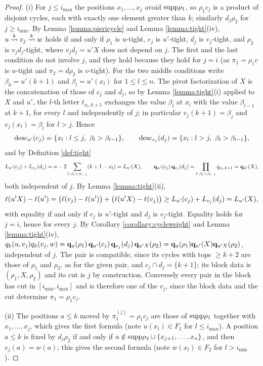 \documentclass{amsart}
\theoremstyle{definition}
\theoremstyle{remark}
\numberwithin{equation}{section}
\newcommand{\xrightsquigarrow}[2][]{%
	\mathrel{\mathop{\rightsquigarrow}\limits^{\scriptstyle #2}%
	\ifx\hfuzz#1\hfuzz\else_{\scriptstyle #1}\fi}%
}
\newcommand{\tom}[1]{\ensuremath{\xrightsquigarrow{#1}}}
\begin{document}
\begin{proof}
(i) For $j\leq i_{\max}$ the positions $x_1,\ldots,x_j$ avoid $\mathrm{supp}\rho_1$, so $\rho_1c_j$ is a product of disjoint cycles, each with exactly one element greater than $k$; similarly $d_j\rho_2$ for $j\geq i_{\min}$. By Lemma \ref{lemma:piericycle} and Lemma \ref{lemma:tight}(iv), $u\tom{k}v_j\tom{k}w$ holds if and only if $\rho_1$ is $u$-tight, $c_j$ is $u'$-tight, $d_j$ is $v_j$-tight, and $\rho_2$ is $v_jd_j$-tight, where $v_jd_j=u'X$ does not depend on $j$. The first and the last condition do not involve $j$, and they hold because they hold for $j=i$ (as $\pi_1=\rho_1c$ is $u$-tight and $\pi_2=d\rho_2$ is $v$-tight). For the two middle conditions write $\beta_0=u'(k+1)$ and $\beta_l=u'(x_l)$ for $1\leq l\leq n$. The pivot factorization of $X$ is the concatenation of those of $c_j$ and $d_j$, so by Lemma \ref{lemma:tight}(i) applied to $X$ and $u'$, the $l$-th letter $t_{x_l,k+1}$ exchanges the value $\beta_l$ at $x_l$ with the value $\beta_{l-1}$ at $k+1$, for every $l$ and independently of $j$; in particular $v_j(k+1)=\beta_j$ and $v_j(x_l)=\beta_l$ for $l>j$. Hence
$$\mathrm{desc}_{u'}(c_j)=\{x_l:l\leq j,\ \beta_l>\beta_{l-1}\},\qquad \mathrm{desc}_{v_j}(d_j)=\{x_l:l>j,\ \beta_l>\beta_{l-1}\},$$
and by Definition \ref{def:tight}
$$L_{u'}(c_j)+L_{v_j}(d_j)=n-2\sum_{l:\,\beta_l>\beta_{l-1}}(k+1-x_l)=L_{u'}(X),\qquad \mathbf{q}_{u'}(c_j)\,\mathbf{q}_{v_j}(d_j)=\prod_{l:\,\beta_l>\beta_{l-1}}q_{x_l,k+1}=\mathbf{q}_{u'}(X),$$
both independent of $j$. By Lemma \ref{lemma:tight}(ii),
$$\ell(u'X)-\ell(u')=\big(\ell(v_j)-\ell(u')\big)+\big(\ell(u'X)-\ell(v_j)\big)\geq L_{u'}(c_j)+L_{v_j}(d_j)=L_{u'}(X),$$
with equality if and only if $c_j$ is $u'$-tight and $d_j$ is $v_j$-tight. Equality holds for $j=i$, hence for every $j$. By Corollary \ref{corollary:cycleweight} and Lemma \ref{lemma:tight}(iv), $q_k(u,v_j)q_k(v_j,w)=\mathbf{q}_u(\rho_1)\,\mathbf{q}_{u'}(c_j)\,\mathbf{q}_{v_j}(d_j)\,\mathbf{q}_{u'X}(\rho_2)=\mathbf{q}_u(\rho_1)\mathbf{q}_{u'}(X)\mathbf{q}_{u'X}(\rho_2)$, independent of $j$. The pair is compatible, since its cycles with tops $\geq k+2$ are those of $\rho_1$ and $\rho_2$, as for the given pair, and $c_j\cap d_j=\{k+1\}$; its block data is $(\rho_1,X,\rho_2)$ and its cut is $j$ by construction. Conversely every pair in the block has cut in $[i_{\min},i_{\max}]$ and is therefore one of the $v_j$, since the block data and the cut determine $\pi_1=\rho_1c_j$.

(ii) The positions $a\leq k$ moved by $\pi_1^{(j)}=\rho_1c_j$ are those of $\mathrm{supp}\rho_1$ together with $x_1,\ldots,x_j$, which gives the first formula (note $u(x_l)\in F_1$ for $l\leq i_{\max}$). A position $a\leq k$ is fixed by $d_j\rho_2$ if and only if $a\notin\mathrm{supp}\rho_2\cup\{x_{j+1},\ldots,x_n\}$, and then $v_j(a)=w(a)$; this gives the second formula (note $w(x_l)\in F_2$ for $l>i_{\min}$).


\end{proof}
\end{document}
